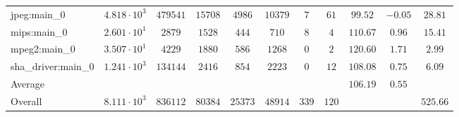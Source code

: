 \begin{tabular}{|l|c|c|c|c|c|c|c|c|c|c|}
jpeg:main\_0            & $ 4.818 \cdot 10^{3} $ & $ 479541 $ & $ 15708 $ & $ 4986  $ & $ 10379 $ & $ 7   $ & $ 61  $ & $ 99.52       $ & $ -0.05   $ & $ 28.81   $ \\
mips:main\_0            & $ 2.601 \cdot 10^{1} $ & $ 2879   $ & $ 1528  $ & $ 444   $ & $ 710   $ & $ 8   $ & $ 4   $ & $ 110.67      $ & $ 0.96    $ & $ 15.41   $ \\
mpeg2:main\_0           & $ 3.507 \cdot 10^{1} $ & $ 4229   $ & $ 1880  $ & $ 586   $ & $ 1268  $ & $ 0   $ & $ 2   $ & $ 120.60      $ & $ 1.71    $ & $ 2.99    $ \\
sha\_driver:main\_0     & $ 1.241 \cdot 10^{3} $ & $ 134144 $ & $ 2416  $ & $ 854   $ & $ 2223  $ & $ 0   $ & $ 12  $ & $ 108.08      $ & $ 0.75    $ & $ 6.09    $ \\
\hline
Average                 & $                    $ & $        $ & $       $ & $       $ & $       $ & $     $ & $     $ & $ 106.19      $ & $ 0.55    $ & $         $ \\
\hline
Overall                 & $ 8.111 \cdot 10^{3} $ & $ 836112 $ & $ 80384 $ & $ 25373 $ & $ 48914 $ & $ 339 $ & $ 120 $ & $             $ & $         $ & $ 525.66  $ \\
\hline
\end{tabular}
